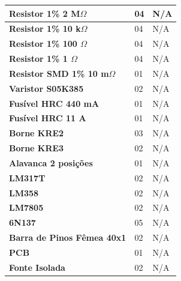 \begin{table}[!ht]
\begin{tabular}{|l|l|l|}
        \textbf{Resistor 1\% 2 M$\Omega$}      & 04                  & N/A                    \\ \hline
        \textbf{Resistor 1\% 10 k$\Omega$}     & 04                  & N/A                    \\ \hline
        \textbf{Resistor 1\% 100 $\Omega$}     & 04                  & N/A                    \\ \hline
        \textbf{Resistor 1\% 1 $\Omega$}       & 04                  & N/A                    \\ \hline
        \textbf{Resistor SMD 1\% 10 m$\Omega$} & 01                  & N/A                    \\ \hline
        \textbf{Varistor S05K385}              & 02                  & N/A                    \\ \hline
        \textbf{Fusível HRC 440 mA}            & 01                  & N/A                    \\ \hline
        \textbf{Fusível HRC 11 A}              & 01                  & N/A                    \\ \hline
        \textbf{Borne KRE2}                    & 03                  & N/A                    \\ \hline
        \textbf{Borne KRE3}                    & 02                  & N/A                    \\ \hline
        \textbf{Alavanca 2 posições}           & 01                  & N/A                    \\ \hline
        \textbf{LM317T}                        & 02                  & N/A                    \\ \hline
        \textbf{LM358}                         & 02                  & N/A                    \\ \hline
        \textbf{LM7805}                        & 02                  & N/A                    \\ \hline
        \textbf{6N137}                         & 05                  & N/A                    \\ \hline
        \textbf{Barra de Pinos Fêmea 40x1}     & 02                  & N/A                    \\ \hline
        \textbf{PCB}                           & 01                  & N/A                    \\ \hline
        \textbf{Fonte Isolada}                 & 02                  & N/A                    \\ \hline
    \end{tabular}
\end{table}